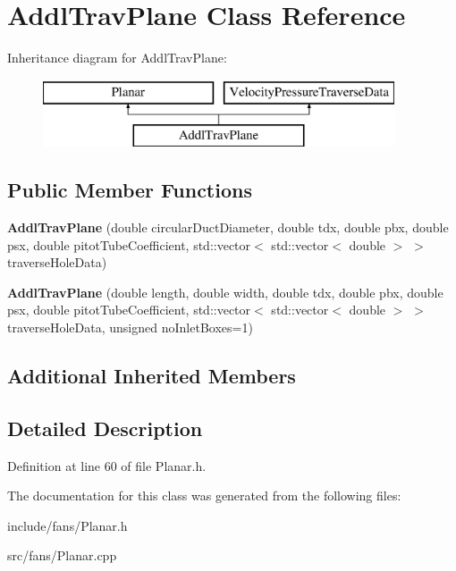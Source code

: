 \hypertarget{class_addl_trav_plane}{}\section{Addl\+Trav\+Plane Class Reference}
\label{class_addl_trav_plane}
Inheritance diagram for Addl\+Trav\+Plane\+:\begin{figure}[H]
\begin{center}
\leavevmode
\includegraphics[height=2.000000cm]{d6/dc1/class_addl_trav_plane}
\end{center}
\end{figure}
\subsection*{Public Member Functions}
\begin{DoxyCompactItemize}
\item 
\mbox{\label{class_addl_trav_plane_a8c59aa98c5b0cf7d1b9ebe731cfc412c}} 
{\bfseries Addl\+Trav\+Plane} (double circular\+Duct\+Diameter, double tdx, double pbx, double psx, double pitot\+Tube\+Coefficient, std\+::vector$<$ std\+::vector$<$ double $>$ $>$ traverse\+Hole\+Data)
\item 
\mbox{\label{class_addl_trav_plane_ab0090a2a5e4190291467fb7cb69791fb}} 
{\bfseries Addl\+Trav\+Plane} (double length, double width, double tdx, double pbx, double psx, double pitot\+Tube\+Coefficient, std\+::vector$<$ std\+::vector$<$ double $>$ $>$ traverse\+Hole\+Data, unsigned no\+Inlet\+Boxes=1)
\end{DoxyCompactItemize}
\subsection*{Additional Inherited Members}


\subsection{Detailed Description}


Definition at line 60 of file Planar.\+h.



The documentation for this class was generated from the following files\+:\begin{DoxyCompactItemize}
\item 
include/fans/Planar.\+h\item 
src/fans/Planar.\+cpp\end{DoxyCompactItemize}
